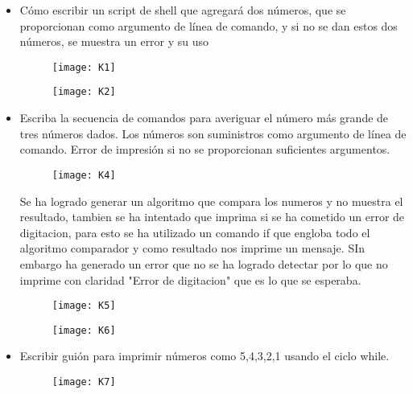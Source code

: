 \documentclass{article}
\begin{document}
\begin{itemize}
    \item Cómo escribir un script de shell que agregará dos números, que se proporcionan como argumento de línea de comando, y si no se dan estos dos números, se muestra un error y su uso

\begin{figure}[H]
\centerline{\texttt{[image: K1]}}
\caption{}
\label{fig}
\end{figure}

\begin{figure}[H]
\centerline{\texttt{[image: K2]}}
\caption{}
\label{fig}
\end{figure}

    \item Escriba la secuencia de comandos para averiguar el número más grande de tres números dados. Los números son suministros como argumento de línea de comando. Error de impresión si no se proporcionan suficientes argumentos.


\begin{figure}[H]
\centerline{\texttt{[image: K4]}}
\caption{}
\label{fig}
\end{figure}

Se ha logrado generar un algoritmo que compara los numeros y no muestra el resultado, tambien se ha intentado que imprima si se ha cometido un error de digitacion, para esto se ha utilizado un comando if que engloba todo el algoritmo comparador y como resultado nos imprime un mensaje. SIn embargo ha generado un error que no se ha logrado detectar por lo que no imprime con claridad "Error de digitacion" que es lo que se esperaba.

\begin{figure}[H]
\centerline{\texttt{[image: K5]}}
\caption{}
\label{fig}
\end{figure}

\begin{figure}[H]
\centerline{\texttt{[image: K6]}}
\caption{}
\label{fig}
\end{figure}

    \item Escribir guión para imprimir números como 5,4,3,2,1 usando el ciclo while.
    
\begin{figure}[H]
\centerline{\texttt{[image: K7]}}
\caption{}
\label{fig}
\end{figure}


\end{itemize}
\end{document}
